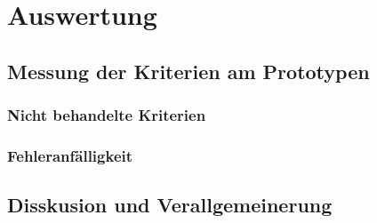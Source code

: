 \chapter{Auswertung}
\section{Messung der Kriterien am Prototypen}
\subsection{Nicht behandelte Kriterien}
\subsection{Fehleranfälligkeit}
\section{Disskusion und Verallgemeinerung}
